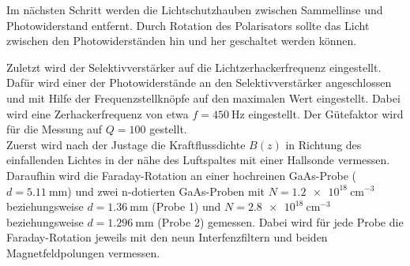 Im nächsten Schritt werden die Lichtschutzhauben zwischen Sammellinse und Photowiderstand entfernt. 
Durch Rotation des Polarisators sollte das Licht zwischen den Photowiderständen hin und her geschaltet werden können.

Zuletzt wird der Selektivverstärker auf die Lichtzerhackerfrequenz eingestellt. Dafür wird einer der Photowiderstände an den Selektivverstärker angeschlossen und mit Hilfe der
Frequenzstellknöpfe auf den maximalen Wert eingestellt. Dabei wird eine Zerhackerfrequenz von etwa $f = \SI{450}{\Hz}$ eingestellt.
Der Gütefaktor wird für die Messung auf $Q = 100$ gestellt.
\\
Zuerst wird nach der Justage die Kraftflussdichte $B(z)$ in Richtung des einfallenden Lichtes in der nähe des Luftspaltes mit einer Hallsonde vermessen.
Daraufhin wird die Faraday-Rotation an einer hochreinen GaAs-Probe ($d = \SI{5.11}{\milli\meter}$)
und zwei n-dotierten GaAs-Proben mit $N = \SI{1.2e18}{\cm^{-3}}$ beziehungsweise $d = \SI{1.36}{\milli\meter}$ (Probe 1) und $N = \SI{2.8e18}{\cm^{-3}}$ beziehungsweise $d = \SI{1.296}{\milli\meter}$ (Probe 2) gemessen.
Dabei wird für jede Probe die Faraday-Rotation jeweils mit den neun Interfenzfiltern und beiden Magnetfeldpolungen vermessen.